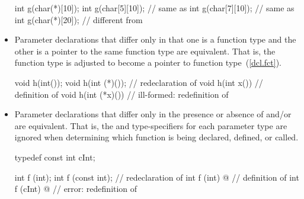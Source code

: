 \begin{note}
\begin{itemize}
\begin{example}
\begin{codeblock}
int g(char(*)[10]);
int g(char[5][10]);             // same as 
int g(char[7][10]);             // same as 
int g(char(*)[20]);             // different from 
\end{codeblock}
\end{example}

\item
{}%
%
Parameter declarations that differ only in that one is a function type
and the other is a pointer to the same function type are equivalent.
That is, the function type is adjusted to become a pointer to function type~(\ref{dcl.fct}).
\begin{example}

\begin{codeblock}
void h(int());
void h(int (*)());              // redeclaration of 
void h(int x()) { }             // definition of 
void h(int (*x)()) { }          // ill-formed: redefinition of 
\end{codeblock}
\end{example}

\item
{}%
%
Parameter declarations that differ only in the presence or absence of
and/or
are equivalent.
That is, the
and
type-specifiers for
each parameter type are ignored when determining which function is being
declared,
defined, or called.
\begin{example}
\begin{codeblock}
typedef const int cInt;

int f (int);
int f (const int);              // redeclaration of 
int f (int) { @\commentellip@ }       // definition of 
int f (cInt) { @\commentellip@ }      // error: redefinition of 
\end{codeblock}
\end{example}


\end{itemize}
\end{note}
